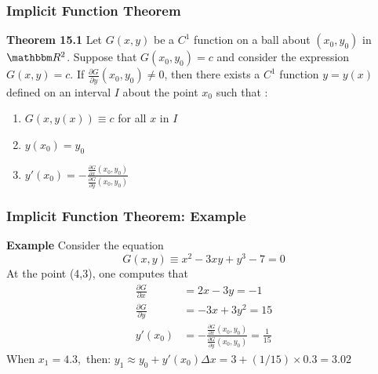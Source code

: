 \documentclass[9pt,aspectratio=169]{beamer}
\newcommand{\RR}{\mathbbm R}
\begin{document}
\begin{frame}
	\frametitle{Implicit Function Theorem}
	\begin{block}{\textbf{Theorem 15.1}}
        Let $G(x,y)$ be a $C^1$ function on a ball about $(x_0,y_0)$ in
        $\RR^2$. Suppose that $G(x_0,y_0) = c$ and consider the expression
        $G(x,y) = c.$ If $\frac{\partial G}{\partial y}(x_0,y_0)\neq 0$, then
        there exists a $C^1$ function $y = y(x)$ defined on an interval $I$
        about the point $x_0$ such that :
	\begin{enumerate}
		\item[(a)] $G(x,y(x))\equiv c$ for all $x$ in $I$
		\item[(b)] $y(x_0) = y_0$
		\item[(c)] $y'(x_0) = -\frac{\frac{\partial G}{\partial x}(x_0,y_0)}{\frac{\partial G}{\partial y}(x_0,y_0)}$
	\end{enumerate}
	\end{block}
\end{frame}	


\begin{frame}
	\frametitle{Implicit Function Theorem: Example}
	\begin{block}{\textbf{Example}}
	Consider the equation $$G(x,y) \equiv x^2-3xy+y^3-7 = 0$$
	At the point (4,3), one computes that 
	\begin{align}
	\frac{\partial G}{\partial x} &= 2x-3y = -1 \nonumber \\
	\frac{\partial G}{\partial y} &= -3x+3y^2 = 15 \nonumber  \\
	y'(x_0) &= -\frac{\frac{\partial G}{\partial x}(x_0,y_0)}{\frac{\partial G}{\partial y}(x_0,y_0)} = \frac{1}{15} \nonumber 
	\end{align}
	When $x_1 = 4.3,$ then:
	$y_1 \approx y_0+y'(x_0)\Delta x = 3+(1/15)\times 0.3 = 3.02 $

	\end{block}
\end{frame}	
\end{document}
